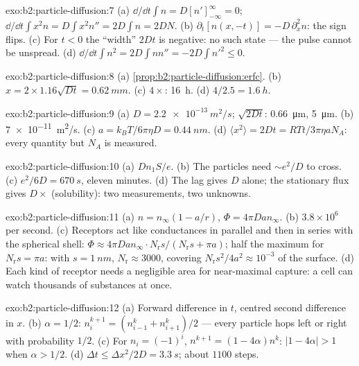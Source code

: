 \begin{solution}{exo:b2:particle-diffusion:7}
(a) $\dd/\dd t\int n = D[n']_{-\infty}^{\infty} = 0$; $\dd/\dd t\int x^2 n = D\int
x^2 n'' = 2D\int n = 2DN$. (b) $\partial_t[n(x,-t)] = -D\,\partial_x^2 n$: the
sign flips. (c) For $t < 0$ the ``width'' $2Dt$ is negative: no such
state --- the pulse cannot be unspread. (d) $\dd/\dd t\int n^2 = 2D\int nn''
= -2D\int n'^2 \le 0$.
\end{solution}

\begin{solution}{exo:b2:particle-diffusion:8}
(a) \cref{prop:b2:particle-diffusion:erfc}. (b) $x = 2 \times 1.16\sqrt{Dt}
= \qty{0.62}{mm}$. (c) $4\times$: \qty{16}{h}. (d) $4/2.5 = \qty{1.6}{h}$.
\end{solution}

\begin{solution}{exo:b2:particle-diffusion:9}
(a) $D = \qty{2.2e-13}{m^2/s}$; $\sqrt{2Dt}$: \qty{0.66}{\micro m},
\qty{5}{\micro m}. (b) \qty{7e-11}{m^2/s}. (c) $a = k_BT/6\pi\eta D =
\qty{0.44}{nm}$. (d) $\langle x^2\rangle = 2Dt = RTt/3\pi\eta a N_A$: every
quantity but $N_A$ is measured.
\end{solution}

\begin{solution}{exo:b2:particle-diffusion:10}
(a) $Dn_1S/e$. (b) The particles need $\sim e^2/D$ to cross. (c)
$e^2/6D = \qty{670}{s}$, eleven minutes. (d) The lag gives $D$ alone;
the stationary flux gives $D \times$ (solubility): two measurements,
two unknowns.
\end{solution}

\begin{solution}{exo:b2:particle-diffusion:11}
(a) $n = n_\infty(1 - a/r)$, $\Phi = 4\pi D a n_\infty$. (b) $3.8 \times
10^6$ per second. (c) Receptors act like conductances in parallel and
then in series with the spherical shell: $\Phi \approx 4\pi Dan_\infty
\cdot N_{\text{r}}s/(N_{\text{r}}s + \pi a)$; half the maximum for
$N_{\text{r}}s = \pi a$: with $s = \qty{1}{nm}$, $N_{\text{r}} \approx
3000$, covering $N_{\text{r}}s^2/4a^2 \approx 10^{-3}$ of the surface.
(d) Each kind of receptor needs a negligible area for near-maximal
capture: a cell can watch thousands of substances at once.
\end{solution}

\begin{solution}{exo:b2:particle-diffusion:12}
(a) Forward difference in $t$, centred second difference in $x$. (b)
$\alpha = 1/2$: $n_i^{k+1} = (n_{i-1}^k + n_{i+1}^k)/2$ --- every particle hops
left or right with probability $1/2$. (c) For $n_i = (-1)^i$, $n^{k+1} =
(1 - 4\alpha)n^k$: $|1 - 4\alpha| > 1$ when $\alpha > 1/2$. (d) $\Delta t \le
\Delta x^2/2D = \qty{3.3}{s}$; about $1100$ steps.
\end{solution}


